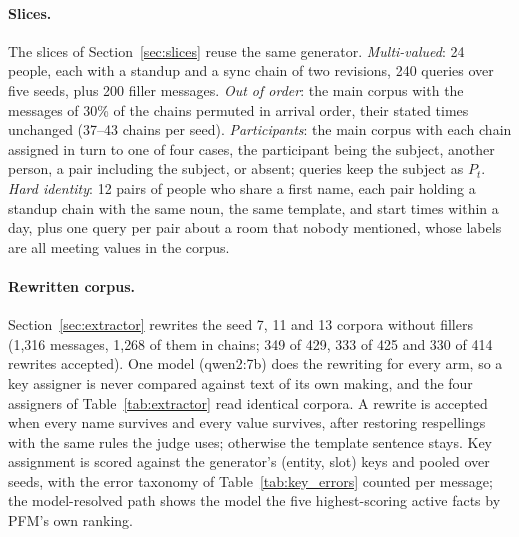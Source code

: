 \documentclass{article} %
\begin{document}
\paragraph{Slices.} The slices of Section~\ref{sec:slices} reuse the same generator. \emph{Multi-valued}: 24 people, each with a standup and a sync chain of two revisions, 240 queries over five seeds, plus 200 filler messages. \emph{Out of order}: the main corpus with the messages of 30\% of the chains permuted in arrival order, their stated times unchanged (37--43 chains per seed). \emph{Participants}: the main corpus with each chain assigned in turn to one of four cases, the participant being the subject, another person, a pair including the subject, or absent; queries keep the subject as $P_t$. \emph{Hard identity}: 12 pairs of people who share a first name, each pair holding a standup chain with the same noun, the same template, and start times within a day, plus one query per pair about a room that nobody mentioned, whose labels are all meeting values in the corpus.

\paragraph{Rewritten corpus.} Section~\ref{sec:extractor} rewrites the seed 7, 11 and 13 corpora without fillers (1{,}316 messages, 1{,}268 of them in chains; 349 of 429, 333 of 425 and 330 of 414 rewrites accepted). One model (qwen2:7b) does the rewriting for every arm, so a key assigner is never compared against text of its own making, and the four assigners of Table~\ref{tab:extractor} read identical corpora. A rewrite is accepted when every name survives and every value survives, after restoring respellings with the same rules the judge uses; otherwise the template sentence stays. Key assignment is scored against the generator's (entity, slot) keys and pooled over seeds, with the error taxonomy of Table~\ref{tab:key_errors} counted per message; the model-resolved path shows the model the five highest-scoring active facts by PFM's own ranking.
\end{document}
